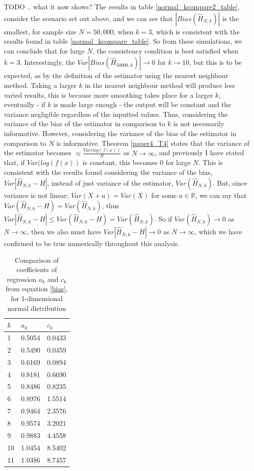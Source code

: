 \documentclass{article}
\begin{document}
TODO .. what it now shows?
The results in table \ref{normal_kcompare2_table}, consider the scenario set out above, and we can see that $|Bias(\hat{H}_{N, k})|$ is the smallest, for sample size $N=50,000$, when $k=3$, which is consistent with the results found in table \ref{normal_kcompare_table}. So from these simulations, we can conclude that for large $N$, the consistency condition is best satisfied when $k=3$. 
Interestingly, the $Var|Bias(\hat{H}_{50000, k})| \to 0$ for $k \to 10$, but this is to be expected, as by the definition of the estimator using the nearest neighbour method. Taking a larger $k$ in the nearest neighbour method will produce less varied results, this is because more smoothing takes place for a larger $k$, eventually - if $k$ is made large enough - the output will be constant and the variance negligible regardless of the inputted values. Thus, considering the variance of the bias of the estimator in comparison to $k$ is not necessarily informative. 
However, considering the variance of the bias of the estimator in comparison to $N$ is informative. Theorem \ref{paper4_T4} states that the variance of the estimator becomes $\approx \frac{Var(log(f(x))}{N}$ as $N \to \infty$, and previously I have stated that, if $Var(log(f(x))$ is constant, this becomes 0 for large $N$. This is consistent with the results found considering the variance of the bias, $Var|\hat{H}_{N, k} - H|$, instead of just variance of the estimator, $Var(\hat{H}_{N, k})$. But, since variance is not linear; $Var(X+a)=Var(X)$ for some $a \in \mathbb{R}$, we can say that $Var(\hat{H}_{N, k} - H) = Var(\hat{H}_{N, k})$, thus  $Var|\hat{H}_{N, k} - H| \leq Var(\hat{H}_{N, k} - H) = Var(\hat{H}_{N, k})$. So if $Var(\hat{H}_{N, k}) \to 0$ as $N \to \infty$, then we also must have $Var|\hat{H}_{N, k} - H| \to 0$ as $N \to \infty$, which we have confirmed to be true numerically throughout this analysis.

\begin{table}
\caption{Comparison of coefficients of regression $a_{k}$ and $c_{k}$ from equation \ref{bias}, for 1-dimensional normal distribution} \label{normal_a_c_compare_table}
\begin{center}
\begin{tabular}{| l | l l |} 
\toprule
$k$ &  $a_{k}$ & $c_{k}$ \\
\midrule[1pt]
1  &  0.5054 & 0.0433 \\
2  & 0.5490 & 0.0459 \\
3  & 0.6169 & 0.0894 \\
4  & 0.8181 & 0.6690 \\
5  & 0.8486 & 0.8235 \\
6  & 0.8976 & 1.5514 \\
7  & 0.9464 & 2.3576 \\
8  & 0.9574 & 3.2021 \\
9  & 0.9883 & 4.4558 \\
10 & 1.0454 & 8.5402 \\
11 & 1.0386 & 8.7457 \\
\hline
\end{tabular}
\\[10pt]
\end{center}
\end{table}
\end{document}
